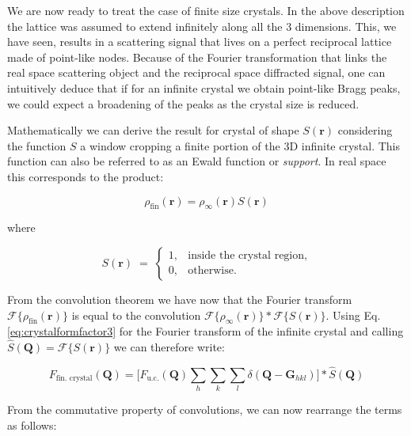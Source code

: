 We are now ready to treat the case of finite size crystals. In the above description the lattice was assumed to extend 
infinitely along all the 3 dimensions. This, we have seen, results in a scattering signal that lives on a perfect reciprocal 
lattice made of point-like nodes. Because of the Fourier transformation that links the real space scattering object and 
the reciprocal space diffracted signal, one can intuitively deduce that if for an infinite crystal we obtain point-like 
Bragg peaks, we could expect a broadening of the peaks as the crystal size is reduced. 

Mathematically we can derive the result for crystal of shape $S(\mathbf r)$ considering the function $S$ a window cropping 
a finite portion of the 3D infinite crystal. This function can also be referred to as an Ewald function \cite{Ewald_1940} or \textit{support}.
 In real space this corresponds to the product: 


\begin{equation}
    \rho_{\text{fin}}(\mathbf{r}) = \rho_{\infty}(\mathbf{r}) S(\mathbf{r})
    \label{eq:window}
\end{equation}

where 

\begin{equation}
    S(\mathbf r) \;=\;
    \begin{cases}
    1, & \text{inside the crystal region}
    , \\[6pt]
    0, & \text{otherwise}.
    \end{cases}
    \label{eq:shape_function_general}
\end{equation}
    
From the convolution theorem we have now that the Fourier transform $\mathcal{F\{}{\rho_{\text{fin}}(\mathbf{r})\}}$ is 
equal to the convolution $ \mathcal{F\{}{\rho_{\infty}(\mathbf{r})\} \ast \mathcal{F\{}S(\mathbf{r})\}}$. 
Using Eq.\ref{eq:crystalformfactor3} for the Fourier transform of the infinite crystal and calling $\widehat S(\mathbf{Q})= \mathcal{F} \{S(\mathbf{r})\}$ 
we can therefore write: 

\begin{equation}
    F_{\text{fin. crystal}}(\mathbf{Q}) = \Big[ F_{\text{u.c.}}(\mathbf{Q}) 
    \sum_{h} \sum_{k} \sum_{l} 
    \delta\!\left(\mathbf Q - \mathbf{G}_{hkl}\right) \Big] \ast \widehat S(\mathbf{Q})
    \label{eq:fin_cryst1}
\end{equation}

From the commutative property of convolutions, we can now rearrange the terms as follows: 

